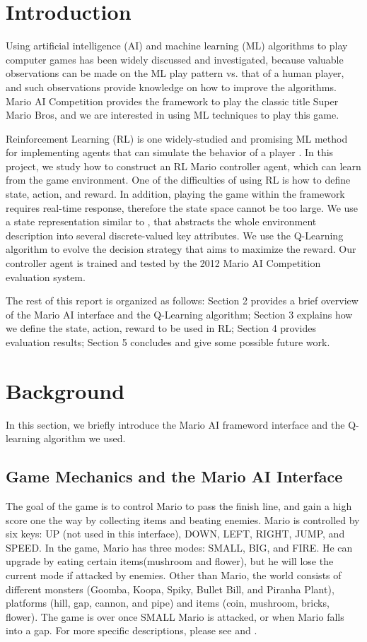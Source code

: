 \section{Introduction}
Using artificial intelligence (AI) and machine learning (ML) algorithms to play computer games has been widely discussed and investigated, because valuable observations can be made on the ML play pattern vs. that of a human player, and such observations provide knowledge on how to improve the algorithms. Mario AI Competition \cite{togelius20102009} provides the framework to play the classic title Super Mario Bros, and we are interested in using ML techniques to play this game. 

Reinforcement Learning (RL) \cite{sutton1998reinforcement} is one widely-studied and promising ML method for implementing agents that can simulate the behavior of a player \cite{tsay2011evolving}. In this project, we study how to construct an RL Mario controller agent, which can learn from the game environment. One of the difficulties of using RL is how to define state, action, and reward. In addition, playing the game within the framework requires real-time response, therefore the state space cannot be too large. We use a state representation similar to \cite{tsay2011evolving}, that abstracts the whole environment description into several discrete-valued key attributes. We use the Q-Learning algorithm to evolve the decision strategy that aims to maximize the reward. Our controller agent is trained and tested by the 2012 Mario AI Competition evaluation system. 

The rest of this report is organized as follows: Section 2 provides a brief overview of the Mario AI interface and the Q-Learning algorithm; Section 3 explains how we define the state, action, reward to be used in RL; Section 4 provides evaluation results; Section 5 concludes and give some possible future work.

\section{Background}
In this section, we briefly introduce the Mario AI frameword interface and the Q-learning algorithm we used.

\subsection{Game Mechanics and the Mario AI Interface}
The goal of the game is to control Mario to pass the finish line, and gain a high score one the way by collecting items and beating enemies. Mario is controlled by six keys: UP (not used in this interface), DOWN, LEFT, RIGHT, JUMP, and SPEED. In the game, Mario has three modes: SMALL, BIG, and FIRE. He can upgrade by eating certain items(mushroom and flower), but he will lose the current mode if attacked by enemies. Other than Mario, the world consists of different monsters (Goomba, Koopa, Spiky, Bullet Bill, and Piranha Plant), platforms (hill, gap, cannon, and pipe) and items (coin, mushroom, bricks, flower). The game is over once SMALL Mario is attacked, or when Mario falls into a gap. For more specific descriptions, please see \cite{tsay2011evolving} and \cite{togelius20102009}.

